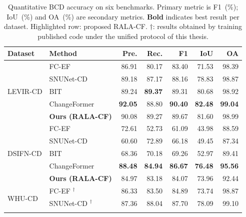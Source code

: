 \begin{table}[htbp]
\centering
\caption{Quantitative \ac{BCD} accuracy on six benchmarks. Primary metric
is F1~(\%); \ac{IoU}~(\%) and \ac{OA}~(\%) are secondary metrics. \textbf{Bold}
indicates best result per dataset. \colorbox{pastelorange}{Highlighted} row:
proposed \ac{RALA-CF}. $\dagger$: results obtained by training published code
under the unified protocol of this thesis.}
\label{tab:main_results}
\renewcommand{\arraystretch}{1.15}
{\small
\begin{tabularx}{\textwidth}{|l|X|r|r|r|r|r|}
\hline
\textbf{Dataset} & \textbf{Method}
    & \textbf{Pre.} & \textbf{Rec.} & \textbf{F1}
    & \textbf{IoU} & \textbf{OA} \\
\hline\hline
\multirow{5}{*}{LEVIR-CD}
    & FC-EF \cite{Daudt2018SiamICIP}
        & 86.91 & 80.17 & 83.40 & 71.53 & 98.39 \\ \cline{2-7}
    & SNUNet-CD \cite{Fang2021SNUNetCD}
        & 89.18 & 87.17 & 88.16 & 78.83 & 98.87 \\ \cline{2-7}
    & BIT \cite{Chen2022BIT}
        & 89.24 & \textbf{89.37} & 89.31 & 80.68 & 98.92 \\ \cline{2-7}
    & ChangeFormer \cite{Bandara2022ChangeFormer}
        & \textbf{92.05} & 88.80 & \textbf{90.40} & \textbf{82.48} & \textbf{99.04} \\ \cline{2-7}
\rowcolor{pastelorange}
    & \textbf{Ours (RALA-CF)}
        & 90.08 & 89.27 & 89.67
        & 81.60 & 98.99 \\
\hline
\multirow{5}{*}{DSIFN-CD}
    & FC-EF \cite{Daudt2018SiamICIP}
        & 72.61 & 52.73 & 61.09 & 43.98 & 88.59 \\ \cline{2-7}
    & SNUNet-CD \cite{Fang2021SNUNetCD}
        & 60.60 & 72.89 & 66.18 & 49.45 & 87.34 \\ \cline{2-7}
    & BIT \cite{Chen2022BIT}
        & 68.36 & 70.18 & 69.26 & 52.97 & 89.41 \\ \cline{2-7}
    & ChangeFormer \cite{Bandara2022ChangeFormer}
        & \textbf{88.48} & \textbf{84.94} & \textbf{86.67} & \textbf{76.48} & \textbf{95.56} \\ \cline{2-7}
\rowcolor{pastelorange}
    & \textbf{Ours (RALA-CF)}
        & 84.97 & 83.18 & 84.07
        & 73.96 & 92.44 \\
\hline
\multirow{5}{*}{WHU-CD}
    & FC-EF \cite{Daudt2018SiamICIP}$^\dagger$
        & 86.33 & 83.50 & 84.89 & 73.74 & 98.87 \\ \cline{2-7}
    & SNUNet-CD \cite{Fang2021SNUNetCD}$^\dagger$
        & 87.36 & 88.04 & 87.70 & 78.09 & 99.10 \\ \cline{2-7}

\end{tabularx}}
\end{table}
